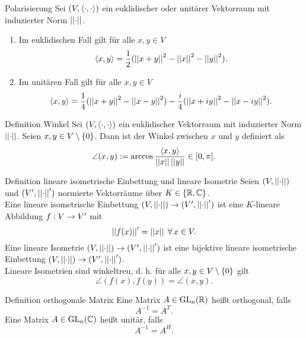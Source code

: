 \documentclass[main.tex]{subfiles}
\begin{document}
\begin{karte}{Polarisierung}
    Sei \((V, \langle \cdot, \cdot \rangle)\) ein euklidischer oder unitärer Vektorraum mit induzierter
    Norm \(\left|\left|\cdot\right|\right|\).
    \begin{enumerate}
        \item Im euklidischen Fall gilt für alle \(x, y \in V\)
        \[ \langle x, y \rangle = \frac{1}{2}(\left|\left|x+y\right|\right|^2-\left|\left|x\right|\right|^2-\left|\left|y\right|\right|^2). \]
        \item Im unitären Fall gilt für alle \(x, y \in V\)
        \[ \langle x, y \rangle = \frac{1}{4}(\left|\left|x+y\right|\right|^2-\left|\left|x-y\right|\right|^2) 
        - \frac{i}{4}(\left|\left|x+iy\right|\right|^2-\left|\left|x-iy\right|\right|^2). \]
    \end{enumerate}
\end{karte}

\begin{karte}{Definition Winkel}
    Sei \((V, \langle \cdot, \cdot \rangle)\) ein euklidischer Vektorraum mit induzierter Norm \(\left|\left|\cdot\right|\right|\).
    Seien \(x, y \in V \setminus \{0\}\). Dann ist der Winkel zwischen \(x\) und \(y\) definiert als
    \[ \angle (x,y) := \arccos \frac{\langle x, y \rangle}{\left|\left|x\right|\right| \left|\left|y\right|\right|} \in [0, \pi]. \]
\end{karte}

\begin{karte}{Definition lineare isometrische Einbettung und lineare Isometrie}
    Seien \((V, \left|\left|\cdot\right|\right|)\) und \((V', \left|\left|\cdot\right|\right|')\) normierte Vektorräume über 
    \(K \in \{\mathbb{R}, \mathbb{C}\}\).\\
    Eine lineare isometrische Einbettung \((V, \left|\left|\cdot\right|\right|) \rightarrow (V', \left|\left|\cdot\right|\right|')\)
    ist eine \(K\)-lineare Abbildung \(f : V \rightarrow V'\) mit
    \[ \norm{f(x)}' = \norm{x} \; \forall x \in V. \]
    Eine lineare Isometrie \((V, \left|\left|\cdot\right|\right|) \rightarrow (V', \left|\left|\cdot\right|\right|')\) ist eine
    bijektive lineare isometrische Einbettung \((V, \left|\left|\cdot\right|\right|) \rightarrow (V', \left|\left|\cdot\right|\right|')\).\\
    Lineare Isometrien sind winkeltreu, d. h. für alle \(x, y \in V \setminus \{0\}\) gilt
    \[ \angle (f(x), f(y)) = \angle (x,y). \]
\end{karte}

\begin{karte}{Definition orthogonale Matrix}
    Eine Matrix \(A \in \operatorname{GL}_n(\mathbb{R})\) heißt orthogonal, falls
    \[ A^{-1} = A^T. \]
    Eine Matrix \(A \in \operatorname{GL}_n(\mathbb{C})\) heißt unitär, falls
    \[A^{-1} = A^H.\]
\end{karte}
\end{document}
